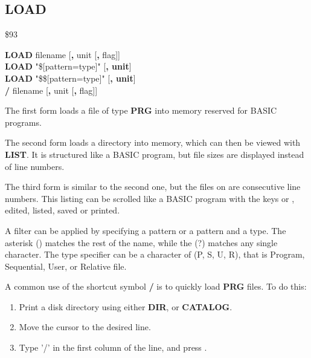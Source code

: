 
\newpage
\subsection{LOAD}
\begin{description}[leftmargin=2cm,style=nextline]
\item [Token:]    \$93

\item [Format:]   {\bf LOAD} filename [{\bf,} unit [{\bf,} flag]] \\
                  {\bf LOAD} "\$[pattern=type]" [{\bf, unit}] \\
                  {\bf LOAD} "\$\$[pattern=type]" [{\bf, unit}] \\
                  {\bf /} filename [{\bf,} unit [{\bf,} flag]]

\item [Usage:]    The first form loads a file of type {\bf PRG} into memory reserved for BASIC programs.

                  The second form loads a directory into memory, which can then be viewed with {\bf LIST}. It is structured like a BASIC program, but file sizes are displayed instead of line numbers.

                  The third form is similar to the second one, but the files on are consecutive line numbers. This listing can be scrolled like a BASIC program with the keys  or , edited, listed, saved or printed.

                  A filter can be applied by specifying a pattern or a pattern and a type. The asterisk ({\bf *}) matches the rest of the name, while the \screentext(?) matches any single character. The type specifier can be a character of (P, S, U, R), that is Program, Sequential, User, or Relative file.

                  A common use of the shortcut symbol {\bf /} is to quickly load {\bf PRG} files. To do this:

                  \begin{enumerate}
                     \item Print a disk directory using either {\bf DIR}, or {\bf CATALOG}.
                     \item Move the cursor to the desired line.
                     \item Type '/' in the first column of the line, and press .
                  \end{enumerate}


\end{description}
